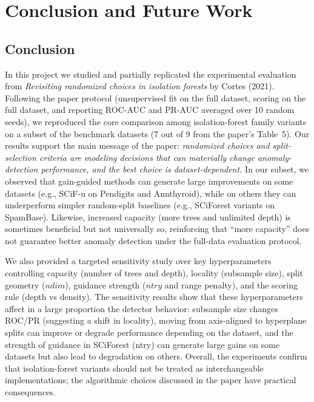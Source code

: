 \section{Conclusion and Future Work}
\label{sec:conclusion}

\subsection{Conclusion}
In this project we studied and partially replicated the experimental evaluation from \emph{Revisiting randomized choices in isolation forests} by Cortes (2021).
Following the paper protocol (unsupervised fit on the full dataset, scoring on the full dataset, and reporting ROC-AUC and PR-AUC averaged over 10 random seeds), we reproduced the core comparison among isolation-forest family variants on a subset of the benchmark datasets (7 out of 9 from the paper's Table~5).
Our results support the main message of the paper: \emph{randomized choices and split-selection criteria are modeling decisions that can materially change anomaly-detection performance, and the best choice is dataset-dependent.}
In our subset, we observed that gain-guided methods can generate large improvements on some datasets (e.g., SCiF-u on Pendigits and Annthyroid), while on others they can underperform simpler random-split baselines (e.g., SCiForest variants on SpamBase).
Likewise, increased capacity (more trees and unlimited depth) is sometimes beneficial but not universally so, reinforcing that ``more capacity'' does not guarantee better anomaly detection under the full-data evaluation protocol.

We also provided a targeted sensitivity study over key hyperparameters controlling capacity (number of trees and depth), locality (subsample size), split geometry ($ndim$), guidance strength ($ntry$ and range penalty), and the scoring rule (depth vs density).
The sensitivity results show that these hyperparameters affect in a large proportion the detector behavior: subsample size changes ROC/PR (suggesting a shift in locality), moving from axis-aligned to hyperplane splits can improve or degrade performance depending on the dataset, and the strength of guidance in SCiForest (ntry) can generate large gains on some datasets but also lead to degradation on others.
Overall, the experiments confirm that isolation-forest variants should not be treated as interchangeable implementations; the algorithmic choices discussed in the paper have practical consequences.

